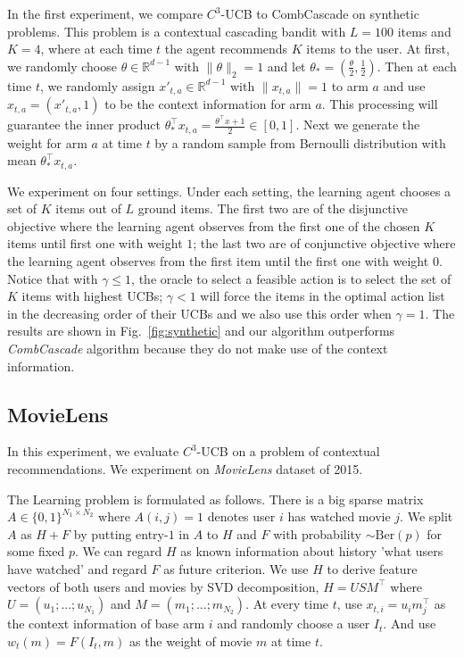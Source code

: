 \documentclass{article}
\newcommand{\RR}{\mathbb{R}}
\begin{document}
In the first experiment, we compare $C^3$-UCB to CombCascade on synthetic problems. This problem is a contextual cascading bandit with $L=100$ items and $K=4$, where at each time $t$ the agent recommends $K$ items to the user. At first, we randomly choose $\theta \in \RR^{d-1}$ with $\|\theta \|_2 = 1$ and let $\theta_* = (\frac{\theta}{2}, \frac{1}{2})$. Then at each time $t$, we randomly assign $x'_{t,a} \in \RR^{d-1}$ with $\|x_{t,a}\| = 1$ to arm $a$ and use $x_{t,a} = (x'_{t,a}, 1)$ to be the context information for arm $a$. This processing will guarantee the inner product $\theta_*^{\top}x_{t,a} = \frac{\theta^{\top}x + 1}{2} \in [0,1]$. Next we generate the weight for arm $a$ at time $t$ by a random sample from Bernoulli distribution with mean $\theta_*^{\top}x_{t,a}$.

We experiment on four settings. Under each setting, the learning agent chooses a set of $K$ items out of $L$ ground items. The first two are of the disjunctive objective where the learning agent observes from the first one of the chosen $K$ items until first one with weight $1$; the last two are of conjunctive objective where the learning agent observes from the first item until the first one with weight $0$. Notice that with $\gamma \leq 1$, the oracle to select a feasible action is to select the set of $K$ items with highest UCBs; $\gamma < 1$ will force the items in the optimal action list in the decreasing order of their UCBs and we also use this order when $\gamma = 1$. The results are shown in Fig.~\ref{fig:synthetic} and our algorithm outperforms {\it CombCascade} algorithm because they do not make use of the context information.


\subsection{MovieLens}

In this experiment, we evaluate $C^3$-UCB on a problem of contextual recommendations. We experiment on {\it MovieLens} dataset \cite{lam2013movie} of 2015.

The Learning problem is formulated as follows. There is a big sparse matrix $A \in \{0,1\}^{N_1 \times N_2}$ where $A(i,j) = 1$ denotes user $i$ has watched movie $j$. We split $A$ as $H + F$ by putting entry-$1$ in $A$ to $H$ and $F$ with probability $\sim \mathrm{Ber}(p)$ for some fixed $p$. We can regard $H$ as known information about history 'what users have watched' and regard $F$ as future criterion. We use $H$ to derive feature vectors of both users and movies by SVD decomposition, $H = USM^{\top}$ where $U = (u_1; ...;u_{N_1})$ and $M = (m_1;...;m_{N_2})$. At every time $t$, use $x_{t,i} = u_{i}m_j^{\top}$ as the context information of base arm $i$ and randomly choose a user $I_t$. And use $w_t(m) = F(I_t,m)$ as the weight of movie $m$ at time $t$.
\end{document}
